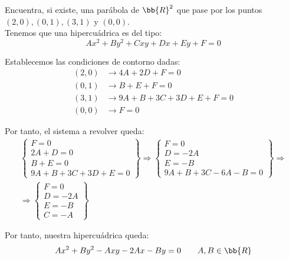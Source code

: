 \begin{ejercicio}
    Encuentra, si existe, una parábola de $\bb{R}^2$ que pase por los puntos $(2, 0), (0, 1), (3, 1)$ y $(0, 0)$.\\

    Tenemos que una hipercuádrica es del tipo:
    \begin{equation*}
        Ax^2+By^2+Cxy+Dx+Ey+F=0
    \end{equation*}

    Establecemos las condiciones de contorno dadas:
    \begin{equation*}
        \begin{split}
            (2,0)&\longrightarrow 4A+2D+F=0\\
            (0,1)&\longrightarrow B+E+F=0\\
            (3,1)&\longrightarrow 9A+B+3C+3D+E+F=0\\
            (0,0)&\longrightarrow F=0
        \end{split}
    \end{equation*}

    Por tanto, el sistema a revolver queda:
    \begin{multline*}
        \left\{\begin{array}{l}
            F=0\\
            2A+D=0 \\
            B+E=0\\
            9A+B+3C+3D+E=0
        \end{array}\right\}
        \Longrightarrow
        \left\{\begin{array}{l}
            F=0\\
            D=-2A \\
            E=-B\\
            9A+B+3C-6A-B=0
        \end{array}\right\}
        \Longrightarrow \\ \Longrightarrow
        \left\{\begin{array}{l}
            F=0\\
            D=-2A \\
            E=-B\\
            C=-A
        \end{array}\right\}
    \end{multline*}

    Por tanto, nuestra hipercuádrica queda:
    \begin{equation*}
        Ax^2+By^2-Axy-2Ax-By=0 \qquad A,B\in \bb{R}
    \end{equation*}


\end{ejercicio}

